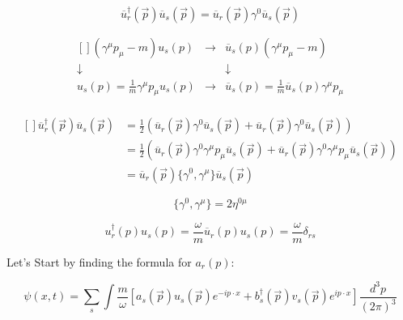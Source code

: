 \documentclass[a4]{article}
\begin{document}
    \begin{equation}
        \overline{u}_{r}^{\dagger} (\vec{p}) \overline{u}_{s} (\vec{p}) = \overline{u}_{r} (\vec{p}) \gamma^{0} \overline{u}_{s} (\vec{p}) 
    \end{equation}

    \begin{equation}
        \begin{aligned} []
            (\gamma^\mu p_\mu - m) u_s (p) & \rightarrow & \overline{u}_s (p) (\gamma^\mu p_\mu - m) \\
            \downarrow & & \downarrow \\
            u_s (p) = \frac{1}{m} \gamma^\mu p_\mu u_s (p) & \rightarrow & \overline{u}_s (p) = \frac{1}{m} \overline{u}_s (p) \gamma^\mu p_\mu \\
        \end{aligned}
    \end{equation}

    \begin{equation}
        \begin{aligned} []
            \overline{u}_{r}^{\dagger} (\vec{p}) \overline{u}_{s} (\vec{p}) & = \frac{1}{2} ( \overline{u}_{r} (\vec{p}) \gamma^{0} \overline{u}_{s} (\vec{p}) + \overline{u}_{r} (\vec{p}) \gamma^{0} \overline{u}_{s} (\vec{p}) ) \\
            & = \frac{1}{2} ( \overline{u}_{r} (\vec{p}) \gamma^{0} \gamma^\mu p_\mu \overline{u}_{s} (\vec{p}) + \overline{u}_{r} (\vec{p}) \gamma^{0} \gamma^\mu p_\mu \overline{u}_{s} (\vec{p}) ) \\
            & = \overline{u}_{r} (\vec{p}) \{ \gamma^0, \gamma^\mu \} \overline{u}_{s} (\vec{p})
        \end{aligned}
    \end{equation}

    \begin{equation}
        \{ \gamma^0, \gamma^\mu \} = 2 \eta^{0 \mu}
    \end{equation}

    \begin{equation}
        u^{\dagger}_r (p) u_s (p) = \frac{\omega}{m} \overline{u}_r (p) u_s (p) = \frac{\omega}{m} \delta_{r s}
    \end{equation}

    Let's Start by finding the formula for $a_{r} (p)$:

    \begin{equation}
        \psi (x, t) = \sum_{s} \int \frac{m}{\omega} [a_s (\vec{p}) u_s (\vec{p}) e^{- i p \cdot x} + b^{\dagger}_s (\vec{p}) v_s (\vec{p}) e^{i p \cdot x}] \frac{d^{3} p}{(2 \pi)^3}
    \end{equation}
\end{document}
